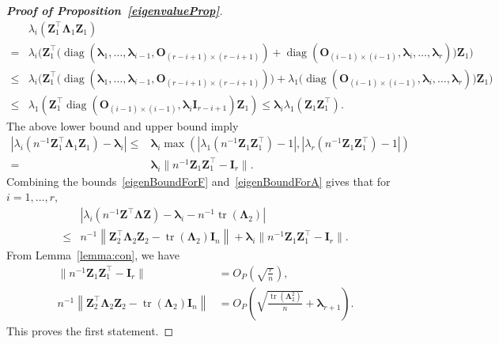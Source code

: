 \documentclass[12pt]{article} %
\DeclareMathOperator{\mytr}{tr}
\DeclareMathOperator{\mydiag}{diag}
\newcommand{\bZ}{\mathbf{Z}}
\newcommand{\bO}{\mathbf{O}}
\newcommand{\bI}{\mathbf{I}}
\newcommand{\bfsym}[1]{\ensuremath{\boldsymbol{#1}}}
\def\blambda {\bfsym {\lambda}}
\def\bLambda {\bfsym {\Lambda}}
\theoremstyle{definition}
\begin{document}
\begin{appendices}
\begin{proof}[\textbf{Proof of Proposition~\ref{eigenvalueProp}}]
\begin{equation*}
\begin{aligned}
&\lambda_i(\bZ_1^\top \bLambda_1 \bZ_1)
\\
=&\lambda_i\Big(
\bZ_1^\top \big(
\mydiag(\blambda_1,\ldots,\blambda_{i-1},\bO_{(r-i+1)\times(r-i+1)})+
\mydiag(\bO_{(i-1)\times(i-1)},\blambda_i,\ldots,\blambda_r)
\big)
\bZ_1
\Big)\\
\leq&\lambda_i\Big(
\bZ_1^\top \big(
\mydiag(\blambda_1,\ldots,\blambda_{i-1},\bO_{(r-i+1)\times(r-i+1)})
\Big)
+
\lambda_1\Big(
\mydiag(\bO_{(i-1)\times(i-1)},\blambda_i,\ldots,\blambda_r)
\big)
\bZ_1
\Big)\\
    \leq&
\lambda_1(\bZ_1^\top \mydiag(\bO_{(i-1)\times(i-1)},\blambda_i \bI_{r-i+1}) \bZ_1)
\leq  \blambda_i \lambda_1(\bZ_1\bZ_1^\top).
\end{aligned}
\end{equation*}
The above lower bound and upper bound imply
\begin{equation}\label{eigenBoundForA}
    \begin{aligned}
\left|
\lambda_i(n^{-1}\bZ_1^\top \bLambda_1 \bZ_1)-\blambda_i
\right|
\leq&
\blambda_i 
\max\left(
    |\lambda_1(n^{-1}\bZ_1 \bZ_1^\top)-1|,
    |\lambda_r(n^{-1}\bZ_1 \bZ_1^\top)-1|
\right)
\\
=&\blambda_i \|n^{-1}\bZ_1\bZ_1^\top -\bI_r\|.
    \end{aligned}
\end{equation}
Combining the bounds~\eqref{eigenBoundForF} and~\eqref{eigenBoundForA} gives that for $i=1,\ldots,r$,
\begin{equation*}
    \begin{split}
        &
        \left|
        \lambda_i\left(n^{-1}\bZ^\top \bLambda \bZ\right)
        -
        \blambda_i
        -
        n^{-1}\mytr(\bLambda_2)
        \right|
        \\
        \leq&
        n^{-1}\left\|\bZ_2^\top \bLambda_2 \bZ_2-\mytr(\bLambda_2) \bI_n\right\|
        +\blambda_i \|n^{-1}\bZ_1\bZ_1^\top -\bI_r\|.
    \end{split}
\end{equation*}
From Lemma~\ref{lemma:con}, we have
\begin{align}
    \label{conB2B1}
            \|n^{-1}\bZ_1\bZ_1^\top -\bI_r\|&=
            O_P\left(\sqrt{\frac{r}{n}}\right),
        \\
        \label{conB2B}
        n^{-1}\left\|\bZ_2^\top \bLambda_2 \bZ_2-\mytr(\bLambda_2)\bI_n\right\|&=O_P\left(\sqrt{\frac{\mytr(\bLambda_2^2)}{ n}}+\blambda_{r+1}\right).
\end{align}
This proves the first statement.


\end{proof}
\end{appendices}
\end{document}
